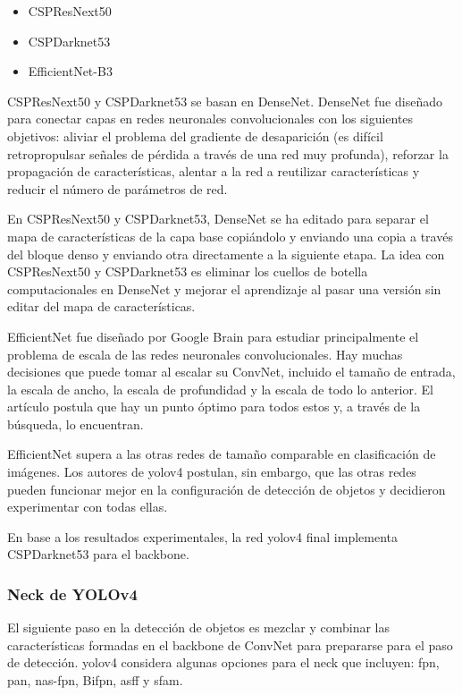 \begin{itemize}
    \item CSPResNext50
    \item CSPDarknet53
    \item EfficientNet-B3
\end{itemize}

CSPResNext50 y CSPDarknet53 se basan en DenseNet. DenseNet fue diseñado para conectar capas en redes neuronales convolucionales con los siguientes objetivos: aliviar el problema del gradiente de desaparición (es difícil retropropulsar señales de pérdida a través de una red muy profunda), reforzar la propagación de características, alentar a la red a reutilizar características y reducir el número de parámetros de red.

En CSPResNext50 y CSPDarknet53, DenseNet se ha editado para separar el mapa de características de la capa base copiándolo y enviando una copia a través del bloque denso y enviando otra directamente a la siguiente etapa. La idea con CSPResNext50 y CSPDarknet53 es eliminar los cuellos de botella computacionales en DenseNet y mejorar el aprendizaje al pasar una versión sin editar del mapa de características.

EfficientNet fue diseñado por Google Brain para estudiar principalmente el problema de escala de las redes neuronales convolucionales. Hay muchas decisiones que puede tomar al escalar su ConvNet, incluido el tamaño de entrada, la escala de ancho, la escala de profundidad y la escala de todo lo anterior. El artículo \cite{tan2020efficientdet} postula que hay un punto óptimo para todos estos y, a través de la búsqueda, lo encuentran.

EfficientNet supera a las otras redes de tamaño comparable en clasificación de imágenes. Los autores de \gls{yolov4} postulan, sin embargo, que las otras redes pueden funcionar mejor en la configuración de detección de objetos y decidieron experimentar con todas ellas.

En base a los resultados experimentales, la red \gls{yolov4} final implementa CSPDarknet53 para el backbone.

\subsubsection*{Neck de YOLOv4}
\label{subsubsec:yolov4-neck}

El siguiente paso en la detección de objetos es mezclar y combinar las características formadas en el backbone de ConvNet para prepararse para el paso de detección. \gls{yolov4} considera algunas opciones para el neck que incluyen: \gls{fpn}, \gls{pan}, \gls{nas}-\gls{fpn}, Bi\gls{fpn}, \gls{asff} y \gls{sfam}.



